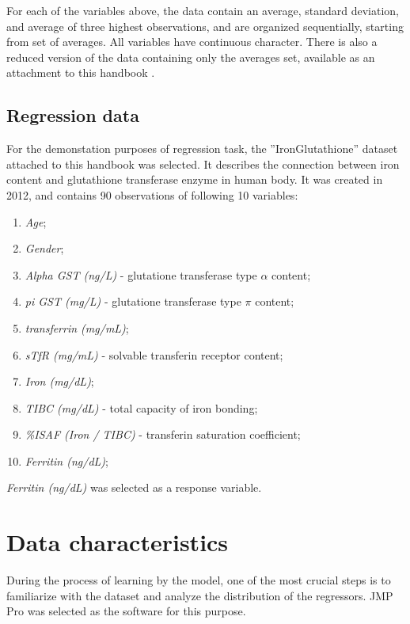 	For each of the variables above, the data contain an average, standard deviation, and average of three highest observations, and are organized sequentially, starting from set of averages. All variables have continuous character. There is also a reduced version of the data containing only the averages set, available as an attachment to this handbook \cite{biostatisticsJMP}.
	
\subsection{Regression data}

	For the demonstation purposes of regression task, the ''IronGlutathione'' dataset attached to this handbook \cite{biostatisticsJMP} was selected. It describes the connection between iron content and glutathione transferase enzyme in human body. It was created in 2012, and contains 90 observations of following 10 variables:  
	
	\begin{enumerate}
		\item \textit{Age};
		\item \textit{Gender};
		\item \textit{Alpha GST (ng/L)} - glutatione transferase type $\alpha$ content;
		\item \textit{pi GST (mg/L)} - glutatione transferase type  $\pi$ content;
		\item \textit{transferrin (mg/mL)};
		\item \textit{sTfR (mg/mL)} - solvable transferin receptor content;
		\item \textit{Iron (mg/dL)};
		\item \textit{TIBC (mg/dL)} - total capacity of iron bonding;
		\item \textit{\%ISAF (Iron / TIBC)} - transferin saturation coefficient;
		\item \textit{Ferritin (ng/dL)};
	\end{enumerate} 
	
	\textit{Ferritin (ng/dL)} was selected as a response variable.
	
\section{Data characteristics}

	During the process of learning by the model, one of the most crucial steps is to familiarize with the dataset and analyze the distribution of the regressors. JMP Pro \cite{jmp} was selected as the software for this purpose.

